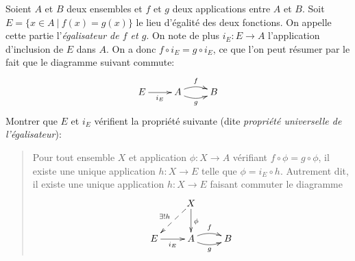 \begin{exercice}[Égalisateurs]\label{exo-egalisateur}
Soient $A$ et $B$ deux ensembles et $f$ et $g$ deux applications entre $A$ et $B$. Soit $E = \{x\in A\:|\: f(x)=g(x)\}$ le lieu d'égalité des deux fonctions. On appelle cette partie l'\emph{égalisateur de $f$ et $g$}. On note de plus $i_E : E\to A$ l'application d'inclusion de $E$ dans $A$. On a donc $f\circ i_E = g\circ i_E$, ce que l'on peut résumer par le fait que le diagramme suivant commute:
\[
\xymatrix{
E \ar[r]_{i_E}& A\ar@/^/[r] ^{f} \ar@/_/[r]_{g} & B
}
\]
Montrer que $E$ et $i_E$ vérifient la propriété suivante (dite \emph{propriété universelle de l'égalisateur}):
\begin{quote}
Pour tout ensemble $X$ et application $\phi : X\to A$ vérifiant $f\circ \phi = g\circ \phi$,  il existe une unique application $h : X\to E$ telle que $\phi = i_E\circ h $. Autrement dit, il existe une unique application $h : X\to E$ faisant commuter le diagramme 
\[
\xymatrix{
& X \ar[d]^{\phi} \ar@{-->}_{\exists ! h}[dl]& \\
E \ar[r]_{i_E}& A\ar@/^/[r] ^{f} \ar@/_/[r]_{g} & B
}
\]
\end{quote}
\end{exercice}



